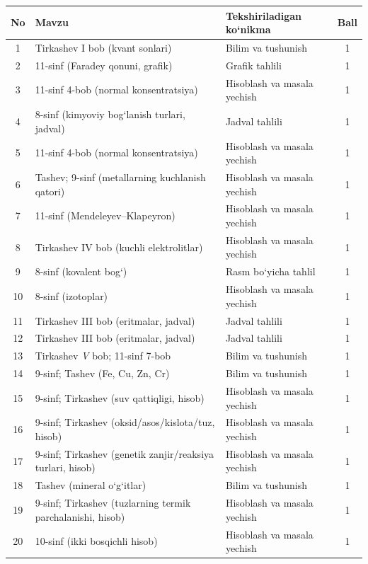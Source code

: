 \documentclass[11pt,a4paper]{article}
\begin{document}
{\small\noindent\begin{longtable}{|c|p{7.2cm}|p{5.4cm}|c|}\hline \textbf{No} & \textbf{Mavzu} & \textbf{Tekshiriladigan ko`nikma} & \textbf{Ball}\\\hline
1 & Tirkashev I bob (kvant sonlari) & Bilim va tushunish & 1\\\hline
2 & 11-sinf (Faradey qonuni, grafik) & Grafik tahlili & 1\\\hline
3 & 11-sinf 4-bob (normal konsentratsiya) & Hisoblash va masala yechish & 1\\\hline
4 & 8-sinf (kimyoviy bog`lanish turlari, jadval) & Jadval tahlili & 1\\\hline
5 & 11-sinf 4-bob (normal konsentratsiya) & Hisoblash va masala yechish & 1\\\hline
6 & Tashev; 9-sinf (metallarning kuchlanish qatori) & Hisoblash va masala yechish & 1\\\hline
7 & 11-sinf (Mendeleyev--Klapeyron) & Hisoblash va masala yechish & 1\\\hline
8 & Tirkashev IV bob (kuchli elektrolitlar) & Hisoblash va masala yechish & 1\\\hline
9 & 8-sinf (kovalent bog`) & Rasm bo`yicha tahlil & 1\\\hline
10 & 8-sinf (izotoplar) & Hisoblash va masala yechish & 1\\\hline
11 & Tirkashev III bob (eritmalar, jadval) & Jadval tahlili & 1\\\hline
12 & Tirkashev III bob (eritmalar, jadval) & Jadval tahlili & 1\\\hline
13 & Tirkashev \textit{V} bob; 11-sinf 7-bob & Bilim va tushunish & 1\\\hline
14 & 9-sinf; Tashev (Fe, Cu, Zn, Cr) & Bilim va tushunish & 1\\\hline
15 & 9-sinf; Tirkashev (suv qattiqligi, hisob) & Hisoblash va masala yechish & 1\\\hline
16 & 9-sinf; Tirkashev (oksid/asos/kislota/tuz, hisob) & Hisoblash va masala yechish & 1\\\hline
17 & 9-sinf; Tirkashev (genetik zanjir/reaksiya turlari, hisob) & Hisoblash va masala yechish & 1\\\hline
18 & Tashev (mineral o`g`itlar) & Bilim va tushunish & 1\\\hline
19 & 9-sinf; Tirkashev (tuzlarning termik parchalanishi, hisob) & Hisoblash va masala yechish & 1\\\hline
20 & 10-sinf (ikki bosqichli hisob) & Hisoblash va masala yechish & 1\\\hline

\end{longtable}}
\end{document}
